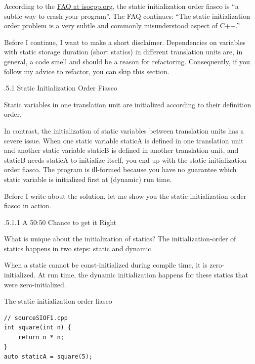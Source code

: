 
According to the \href{https://isocpp.org/wiki/faq/ctors#static-init-order}{FAQ at isocpp.org}, the static initialization order fiasco is “a subtle way to crash your program”. The FAQ continues: “The static initialization order problem is a very subtle and commonly misunderstood aspect of C++.”

Before I continue, I want to make a short disclaimer. Dependencies on variables with static storage duration (short statics) in different translation units are, in general, a code smell and should be a reason for refactoring. Consequently, if you follow my advice to refactor, you can skip this section.

.5.1\hspace{0.2cm} Static Initialization Order Fiasco

Static variables in one translation unit are initialized according to their definition order.

In contrast, the initialization of static variables between translation units has a severe issue. When one static variable staticA is defined in one translation unit and another static variable staticB is defined in another translation unit, and staticB needs staticA to initialize itself, you end up with the static initialization order fiasco. The program is ill-formed because you have no guarantee which static variable is initialized first at (dynamic) run time.

Before I write about the solution, let me show you the static initialization order fiasco in action.

.5.1.1\hspace{0.2cm} A 50:50 Chance to get it Right

What is unique about the initialization of statics? The initialization-order of statics happens in two steps: static and dynamic.

When a static cannot be const-initialized during compile time, it is zero-initialized. At run time, the dynamic initialization happens for these statics that were zero-initialized.

\noindent
The static initialization order fiasco
\begin{lstlisting}[style=styleCXX]
// sourceSIOF1.cpp
int square(int n) {
	return n * n;
}
auto staticA = square(5);
\end{lstlisting}

